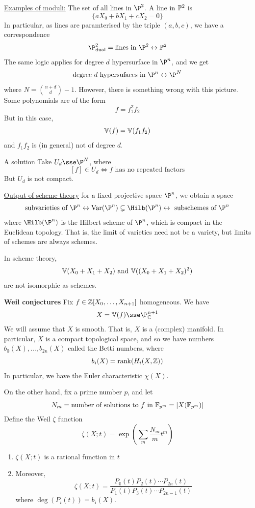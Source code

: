 \documentclass{article}
\begin{document}
\underline{Examples of moduli:} The set of all lines in \(\P^2\). A line in \(\mathbb{P}^2\) is
\[\{a X_0 + bX_1 + cX_2 = 0\}\]
In particular, as lines are paramterised by the triple \((a,b, c)\), we have a correspondence
\[\P^2_\text{dual} = \text{lines in }\P^2 \bij \bb P^2\]
The same logic applies for degree \(d\) hypersurface in \(\P^n\), and we get
\[\text{degree }d\text{ hypersufaces in }\P^n \bij \P^N\]
where \(N = {n + d \choose d} - 1\). However, there is something wrong with this picture. Some polynomials are of the form
\[f = f_1^2f_2\]
But in this case,
\[\mathbb{V}(f) = \mathbb{V}(f_1f_2)\]
and \(f_1f_2\) is (in general) not of degree \(d\).

\underline{A solution} Take \(U_d \sse \P^N\), where
\[[f] \in U_d \iff f\text{ has no repeated factors}\]
But \(U_d\) is not compact.

\underline{Output of scheme theory} for a fixed projective space \(\P^n\), we obtain a space
\[\text{subvarieties of }\P^n \bij \Var(\P^n) \subsetneq \Hilb(\P^n) \bij \text{ subschemes of }\P^n\]
where \(\Hilb(\P^n)\) is the Hilbert scheme of \(\P^n\), which is compact in the Euclidean topology. That is, the limit of varieties need not be a variety, but limits of schemes are always schemes.

In scheme theory,
\[\mathbb{V}(X_0 + X_1 + X_2) \text{ and }\mathbb{V}((X_0 + X_1 + X_2)^2)\]
are not isomorphic as schemes.

\textbf{Weil conjectures} Fix \(f \in \mathbb{Z}[X_0, \dots, X_{n+1}]\) homogeneous. We have
\[X = \van(f) \sse \P^{n+1}_\C\]
We will assume that \(X\) is smooth. That is, \(X\) is a (complex) manifold. In particular, \(X\) is a compact topological space, and so we have numbers \(b_0(X), \dots, b_{2n}(X)\) called the Betti numbers, where
\[b_i(X) = \rank(H_i(X, \mathbb{Z}))\]
In particular, we have the Euler characteristic \(\chi(X)\).

On the other hand, fix a prime number \(p\), and let
\[N_m = \text{number of solutions to }f\text{ in }\mathbb{F}_{p^m} = \abs{X(\mathbb{F}_{p^m})}\]
Define the Weil \(\zeta\) function
\[\zeta(X; t) = \exp(\sum_m\frac{N_m}{m}t^m)\]

\begin{theorem}
    \begin{enumerate}
        \item \(\zeta(X; t)\) is a rational function in \(t\)
        \item Moreover,
        \[\zeta(X; t) = \frac{P_0(t)P_2(t)\cdots P_{2n}(t)}{P_1(t)P_3(t)\cdots P_{2n-1}(t)}\]
        where \(\deg(P_i(t)) = b_i(X)\).
    \end{enumerate}
\end{theorem}
\end{document}
